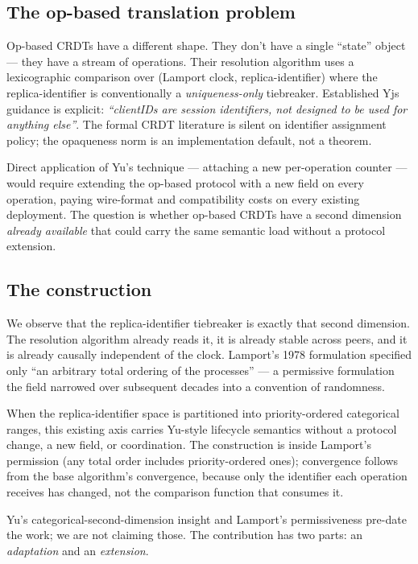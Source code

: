 \subsection{The op-based translation problem}

Op-based CRDTs have a different shape. They don't have a single ``state'' object --- they have a stream of operations. Their resolution algorithm uses a lexicographic comparison over (Lamport clock, replica-identifier) where the replica-identifier is conventionally a \emph{uniqueness-only} tiebreaker. Established Yjs guidance is explicit: \emph{``clientIDs are session identifiers, not designed to be used for anything else''}\cite{jahns2020clientid}. The formal CRDT literature is silent on identifier assignment policy; the opaqueness norm is an implementation default, not a theorem.

Direct application of Yu's technique --- attaching a new per-operation counter --- would require extending the op-based protocol with a new field on every operation, paying wire-format and compatibility costs on every existing deployment. The question is whether op-based CRDTs have a second dimension \emph{already available} that could carry the same semantic load without a protocol extension.

\subsection{The construction}

We observe that the replica-identifier tiebreaker is exactly that second dimension. The resolution algorithm already reads it, it is already stable across peers, and it is already causally independent of the clock. Lamport's 1978 formulation\cite{lamport1978} specified only ``an arbitrary total ordering of the processes'' --- a permissive formulation the field narrowed over subsequent decades into a convention of randomness.

When the replica-identifier space is partitioned into priority-ordered categorical ranges, this existing axis carries Yu-style lifecycle semantics without a protocol change, a new field, or coordination. The construction is inside Lamport's permission (any total order includes priority-ordered ones); convergence follows from the base algorithm's convergence, because only the identifier each operation receives has changed, not the comparison function that consumes it.

Yu's categorical-second-dimension insight and Lamport's permissiveness pre-date the work; we are not claiming those. The contribution has two parts: an \emph{adaptation} and an \emph{extension}.

